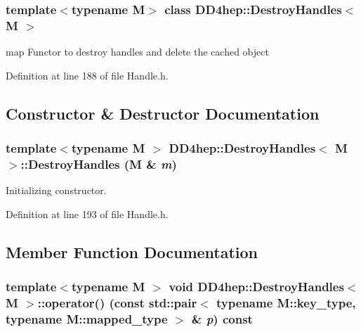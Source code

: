 \subsubsection*{template$<$typename M$>$ class DD4hep::DestroyHandles$<$ M $>$}

map Functor to destroy handles and delete the cached object 

Definition at line 188 of file Handle.h.

\subsection{Constructor \& Destructor Documentation}
\hypertarget{class_d_d4hep_1_1_destroy_handles_a6ea33093d41f7687b16b6cdff8d265f3}{
\subsubsection[{DestroyHandles}]{\setlength{\rightskip}{0pt plus 5cm}template$<$typename M $>$ {\bf DD4hep::DestroyHandles}$<$ M $>$::{\bf DestroyHandles} (M \& {\em m})}}
\label{class_d_d4hep_1_1_destroy_handles_a6ea33093d41f7687b16b6cdff8d265f3}


Initializing constructor. 

Definition at line 193 of file Handle.h.

\subsection{Member Function Documentation}
\hypertarget{class_d_d4hep_1_1_destroy_handles_adeb0ed44285c0259a3124aac8ee67cdf}{
\subsubsection[{operator()}]{\setlength{\rightskip}{0pt plus 5cm}template$<$typename M $>$ void {\bf DD4hep::DestroyHandles}$<$ M $>$::operator() (const std::pair$<$ typename M::key\_\-type, typename M::mapped\_\-type $>$ \& {\em p}) const}}
\label{class_d_d4hep_1_1_destroy_handles_adeb0ed44285c0259a3124aac8ee67cdf}


